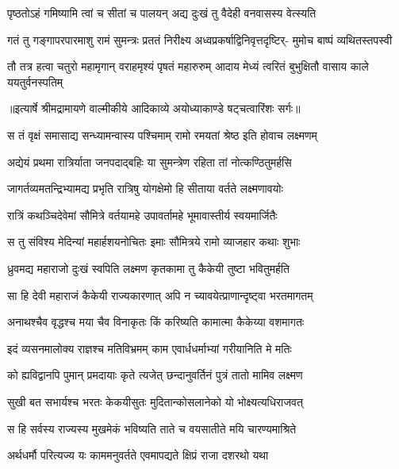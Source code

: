\twolineshloka
{पृष्ठतोऽहं गमिष्यामि त्वां च सीतां च पालयन्}
{अद्य दुःखं तु वैदेही वनवासस्य वेत्स्यति} %

\fourlineindentedshloka
{गतं तु गङ्गापरपारमाशु}
{रामं सुमन्त्रः प्रततं निरीक्ष्य}
{अध्वप्रकर्षाद्विनिवृत्तदृष्टिर्-}
{मुमोच बाष्पं व्यथितस्तपस्वी} %

\fourlineindentedshloka
{तौ तत्र हत्वा चतुरो महामृगान्}
{वराहमृश्यं पृषतं महारुरुम्}
{आदाय मेध्यं त्वरितं बुभुक्षितौ}
{वासाय काले ययतुर्वनस्पतिम्} %


{॥इत्यार्षे श्रीमद्रामायणे वाल्मीकीये आदिकाव्ये अयोध्याकाण्डे षट्चत्वारिंशः सर्गः॥}


\twolineshloka
{स तं वृक्षं समासाद्य सन्ध्यामन्वास्य पश्चिमाम्}
{रामो रमयतां श्रेष्ठ इति होवाच लक्ष्मणम्} %

\twolineshloka
{अद्येयं प्रथमा रात्रिर्याता जनपदाद्बहिः}
{या सुमन्त्रेण रहिता तां नोत्कण्ठितुमर्हसि} %

\twolineshloka
{जागर्तव्यमतन्द्रिभ्यामद्य प्रभृति रात्रिषु}
{योगक्षेमो हि सीताया वर्तते लक्ष्मणावयोः} %

\twolineshloka
{रात्रिं कथञ्चिदेवेमां सौमित्रे वर्तयामहे}
{उपावर्तामहे भूमावास्तीर्य स्वयमार्जितैः} %

\twolineshloka
{स तु संविश्य मेदिन्यां महार्हशयनोचितः}
{इमाः सौमित्रये रामो व्याजहार कथाः शुभाः} %

\twolineshloka
{ध्रुवमद्य महाराजो दुःखं स्वपिति लक्ष्मण}
{कृतकामा तु कैकेयी तुष्टा भवितुमर्हति} %

\twolineshloka
{सा हि देवी महाराजं कैकेयी राज्यकारणात्}
{अपि न च्यावयेत्प्राणान्दृष्ट्वा भरतमागतम्} %

\twolineshloka
{अनाथश्चैव वृद्धश्च मया चैव विनाकृतः}
{किं करिष्यति कामात्मा कैकेय्या वशमागतः} %

\twolineshloka
{इदं व्यसनमालोक्य राज्ञश्च मतिविभ्रमम्}
{काम एवार्धधर्माभ्यां गरीयानिति मे मतिः} %

\twolineshloka
{को ह्यविद्वानपि पुमान् प्रमदायाः कृते त्यजेत्}
{छन्दानुवर्तिनं पुत्रं तातो मामिव लक्ष्मण} %

\twolineshloka
{सुखी बत सभार्यश्च भरतः केकयीसुतः}
{मुदितान्कोसलानेको यो भोक्ष्यत्यधिराजवत्} %

\twolineshloka
{स हि सर्वस्य राज्यस्य मुखमेकं भविष्यति}
{ताते च वयसातीते मयि चारण्यमाश्रिते} %

\twolineshloka
{अर्थधर्मौ परित्यज्य यः काममनुवर्तते}
{एवमापद्यते क्षिप्रं राजा दशरथो यथा} %

